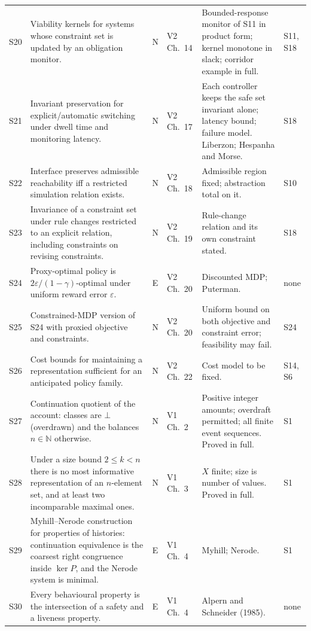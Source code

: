 \documentclass[10pt]{article}
\newcommand{\NN}{\mathbb{N}}
\begin{document}
\begin{longtable}{@{}l p{} c l p{} p{}@{}}
S20 & Viability kernels for systems whose constraint set is updated by an obligation monitor. & N & V2 Ch.~14 & Bounded-response monitor of S11 in product form; kernel monotone in slack; corridor example in full. & S11, S18\\[3pt]
S21 & Invariant preservation for explicit/automatic switching under dwell time and monitoring latency. & N & V2 Ch.~17 & Each controller keeps the safe set invariant alone; latency bound; failure model. Liberzon; Hespanha and Morse. & S18\\[3pt]
S22 & Interface preserves admissible reachability iff a restricted simulation relation exists. & N & V2 Ch.~18 & Admissible region fixed; abstraction total on it. & S10\\[3pt]
S23 & Invariance of a constraint set under rule changes restricted to an explicit relation, including constraints on revising constraints. & N & V2 Ch.~19 & Rule-change relation and its own constraint stated. & S18\\[3pt]
S24 & Proxy-optimal policy is $2\varepsilon/(1-\gamma)$-optimal under uniform reward error $\varepsilon$. & E & V2 Ch.~20 & Discounted MDP; Puterman. & none\\[3pt]
S25 & Constrained-MDP version of S24 with proxied objective and constraints. & N & V2 Ch.~20 & Uniform bound on both objective and constraint error; feasibility may fail. & S24\\[3pt]
S26 & Cost bounds for maintaining a representation sufficient for an anticipated policy family. & N & V2 Ch.~22 & Cost model to be fixed. & S14, S6\\[3pt]
S27 & Continuation quotient of the account: classes are $\bot$ (overdrawn) and the balances $n\in\NN$ otherwise. & N & V1 Ch.~2 & Positive integer amounts; overdraft permitted; all finite event sequences. Proved in full. & S1\\[3pt]
S28 & Under a size bound $2\le k<n$ there is no most informative representation of an $n$-element set, and at least two incomparable maximal ones. & N & V1 Ch.~3 & $X$ finite; size is number of values. Proved in full. & S1\\[3pt]
S29 & Myhill--Nerode construction for properties of histories: continuation equivalence is the coarsest right congruence inside $\ker P$, and the Nerode system is minimal. & E & V1 Ch.~4 & Myhill; Nerode. & S1\\[3pt]
S30 & Every behavioural property is the intersection of a safety and a liveness property. & E & V1 Ch.~4 & Alpern and Schneider (1985). & none\\[3pt]

\end{longtable}
\end{document}
